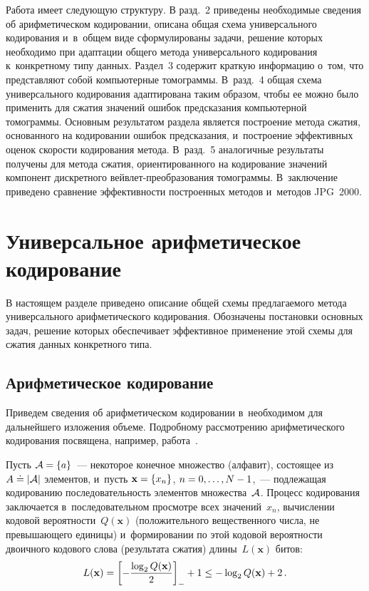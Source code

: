 \begin{multicols}{2}
Работа имеет следующую структуру. В разд.~2 приведены 
необходимые сведения об арифметическом кодировании, описана общая 
схема универсального кодирования и~в~общем виде сформулированы задачи, решение 
которых необходимо при адаптации общего метода универсального кодирования 
к~конкретному типу данных. Раздел~3 содержит краткую информацию 
о~том, что пред\-став\-ля\-ют собой компьютерные томограммы. В~разд.~4 
общая схема универсального кодирования адаптирована таким образом, чтобы 
ее можно было применить для сжатия значений ошибок предсказания компьютерной 
томограммы. Основным результатом раздела является построение метода сжатия, 
основанного на кодировании ошибок предсказания, и~построение эффективных оценок 
ско\-рости кодирования метода. В~разд.~5 аналогичные результаты получены 
для метода сжатия, ориентированного на кодирование значений компонент дискретного 
вей\-в\-лет-пре\-об\-ра\-зо\-ва\-ния томограммы. 
В~заключение приведено сравнение эф\-фек\-тив\-ности построенных методов и~методов JPG~2000.

\vspace*{-9pt}

\section{Универсальное арифметическое кодирование}

В настоящем разделе приведено описание общей схемы предлагаемого метода 
универсального арифметического кодирования. Обозначены постановки основных задач, 
решение которых обеспечивает эффективное применение этой схемы для сжатия данных 
конкретного типа.

\vspace*{-9pt}

\subsection{Арифметическое кодирование}

Приведем сведения об арифметическом кодировании в~необходимом для дальнейшего 
изложения объеме. Подробному рассмотрению арифметического кодирования посвящена, 
например, работа~\cite{b02}.

Пусть ${\cal A}= \{a\}$~--- некоторое конечное множество (алфавит), 
состоящее из $A\doteq|{\cal A}|$ элементов, и~пусть  $\mathbf{x}\hm=\{x_n\}$,  
$n\hm=0,\ldots,N-1$,~--- подлежащая кодированию последовательность элементов 
множества~${\cal A}$. Процесс кодирования заключается в~последовательном 
просмотре всех значений~$x_n$, вычислении кодовой вероятности~$Q(\mathbf{x})$ 
(положительного вещественного числа, не превышающего единицы) и~формировании по 
этой кодовой вероятности двоичного кодового слова (результата сжатия) 
длины~$L(\mathbf{x})$ битов:
\begin{equation}
\label{eq1}
L(\mathbf{x}) = \left[-\displaystyle\frac{\displaystyle \log_{2}Q(\mathbf{x})\mathstrut}{\displaystyle 2\mathstrut}\right]_{-}+1 \leq 
-\log_{2}Q(\mathbf{x})+2\,.
\end{equation}


\end{multicols}
